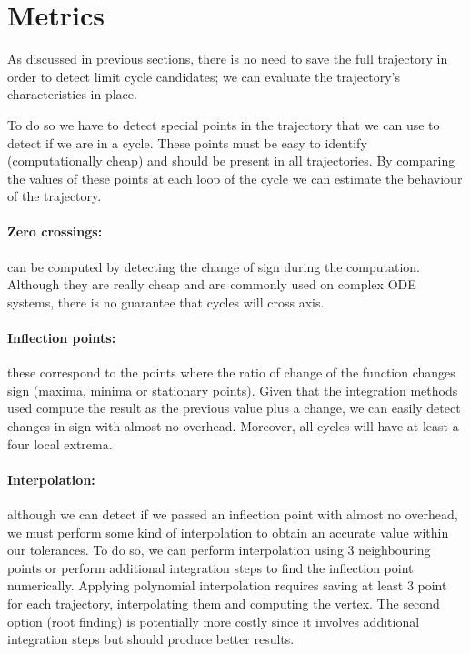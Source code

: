 
\section{Metrics}%
\label{sec:metrics}

As discussed in previous sections, there is no need to save the full trajectory in order to detect limit cycle candidates; we can evaluate the trajectory's characteristics in-place.

To do so we have to detect special points in the trajectory that we can use to detect if we are in a cycle. These points must be easy to identify (computationally cheap) and should be present in all trajectories. By comparing the values of these points at each loop of the cycle we can estimate the behaviour of the trajectory.

\paragraph{Zero crossings:} can be computed by detecting the change of sign
during the computation. Although they are really cheap and are commonly used on complex ODE systems, there is no guarantee that cycles will cross axis.

\paragraph{Inflection points:} these correspond to the points where the ratio of change of the function changes sign (maxima, minima or stationary points). Given that the integration methods used compute the result as the previous value plus a change, we can easily detect changes in sign with almost no overhead. Moreover, all cycles will have at least a four local extrema.

\paragraph{Interpolation:} although we can detect if we passed an inflection point with almost no overhead, we must perform some kind of interpolation to obtain an accurate value within our tolerances. To do so, we can perform interpolation using 3 neighbouring points or perform additional integration steps to find the inflection point numerically. Applying polynomial interpolation requires saving at least 3 point for each trajectory, interpolating them and computing the vertex. The second option (root finding) is potentially more costly since it involves additional integration steps but should produce better results.

